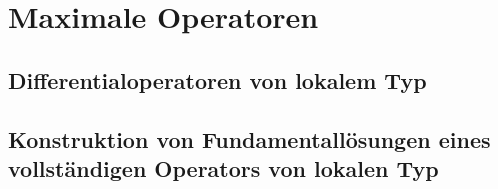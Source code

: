 \chapter{Maximale Operatoren}

\section{Differentialoperatoren von lokalem Typ} %


\section{Konstruktion von Fundamentallösungen eines vollständigen Operators von lokalen Typ} %

